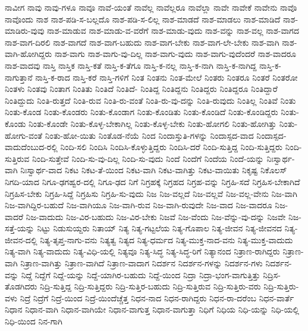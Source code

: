 {ನಾವೀಗ
ನಾವು
ನಾವು-ಗಳೂ
ನಾವೂ
ನಾವೆ-ಯಂತೆ
ನಾವೆಲ್ಲ
ನಾವೆಲ್ಲರೂ
ನಾವೆಲ್ಲಾ
ನಾವೇ
ನಾವೇಕೆ
ನಾವೇನು
ನಾವೊ
ನಾವೊಂದು
ನಾಶ
ನಾಶ-ಪಡಿ-ಸ-ಬಲ್ಲದೊ
ನಾಶ-ಪಡಿ-ಸ-ಲಿಲ್ಲ
ನಾಶ-ಮಾಡದೆ
ನಾಶ-ಮಾಡಲು
ನಾಶ-ಮಾಡಿದೆ
ನಾಶ-ಮಾಡಿರು-ವುವು
ನಾಶ-ಮಾಡುವ
ನಾಶ-ಮಾಡು-ವ-ವರೆಗೆ
ನಾಶ-ಮಾಡು-ವುದು
ನಾಶ-ವನ್ನು
ನಾಶ-ವಲ್ಲ
ನಾಶ-ವಾಗದ
ನಾಶ-ವಾಗ-ದಿರಲಿ
ನಾಶ-ವಾಗದೆ
ನಾಶ-ವಾಗ-ಬಹುದು
ನಾಶ-ವಾಗ-ಬೇಕು
ನಾಶ-ವಾಗ-ಲೇ-ಬೇಕು
ನಾಶ-ವಾಗಿ
ನಾಶ-ವಾಗಿ-ಹೋಗಿದ್ದರು
ನಾಶ-ವಾಗು
ನಾಶ-ವಾಗು-ವು-ದಿಲ್ಲ
ನಾಶ-ವಾಗು-ವುದು
ನಾಶ-ವಾಗು-ವುದೆಂದರೆ
ನಾಶ-ವಾದರೂ
ನಾಶ-ವಾದವು
ನಾಸ್ತಿ
ನಾಸ್ತಿಕ
ನಾಸ್ತಿ-ಕತೆ
ನಾಸ್ತಿ-ಕ-ತೆಗೂ
ನಾಸ್ತಿ-ಕ-ನಲ್ಲ
ನಾಸ್ತಿ-ಕ-ನಾಗಿ
ನಾಸ್ತಿ-ಕ-ನಾಗಿದ್ದ
ನಾಸ್ತಿ-ಕ-ನಾಗುತ್ತಾನೆ
ನಾಸ್ತಿ-ಕ-ರಾದ
ನಾಸ್ತಿ-ಕರೆ
ನಾಸ್ತಿ-ಗಳಿಗೆ
ನಿಂತ
ನಿಂತನು
ನಿಂತ-ಮೇಲೆ
ನಿಂತರು
ನಿಂತರೂ
ನಿಂತರೆ
ನಿಂತರೋ
ನಿಂತಳು
ನಿಂತವು
ನಿಂತಾಗ
ನಿಂತಿತು
ನಿಂತಿದೆ
ನಿಂತಿದೆ-
ನಿಂತಿದ್ದ
ನಿಂತಿದ್ದನು
ನಿಂತಿದ್ದರು
ನಿಂತಿದ್ದರೂ
ನಿಂತಿದ್ದಾರೆ
ನಿಂತಿದ್ದುದು
ನಿಂತಿ-ರುತ್ತದೆ
ನಿಂತಿ-ರುವ
ನಿಂತಿ-ರು-ವಂತೆ
ನಿಂತಿ-ರು-ವು-ದನ್ನು
ನಿಂತಿ-ರುವುದು
ನಿಂತಿಲ್ಲ
ನಿಂತಿವೆ
ನಿಂತು
ನಿಂತು-ಕೊಂಡ
ನಿಂತು-ಕೊಂಡರು
ನಿಂತು-ಕೊಂಡಾಗ
ನಿಂತು-ಕೊಂಡಿತು
ನಿಂತು-ಕೊಂಡಿದೆ
ನಿಂತು-ಕೊಂಡಿದ್ದರು
ನಿಂತು-ಕೊಂಡು
ನಿಂತು-ಕೊಂಡೇ
ನಿಂತು-ಕೊಳ್ಳ-ಬೇಕಾಗಿಲ್ಲ
ನಿಂತು-ಕೊಳ್ಳ-ಬೇಕು
ನಿಂತು-ಹೋಗಲಿ
ನಿಂತು-ಹೋಗಿತ್ತು
ನಿಂತು-ಹೋಗು-ವಂತೆ
ನಿಂತು-ಹೋ-ಯಿತು
ನಿಂತೊಡ-ನೆಯೆ
ನಿಂದ
ನಿಂದಾಸ್ತುತಿ-ಗಳನ್ನು
ನಿಂದಾಸ್ಪದ-ವಾದ
ನಿಂದಾಸ್ಪದ-ವಾದುದೆಂಬುದ-ರಲ್ಲಿ
ನಿಂದಿ-ಸಲಿ
ನಿಂದಿಸಿ
ನಿಂದಿಸಿ-ಕೊಳ್ಳುತ್ತಿದ್ದರು
ನಿಂದಿಸಿ-ದರೆ
ನಿಂದಿ-ಸುತ್ತಿದ್ದ
ನಿಂದಿ-ಸುತ್ತಿದ್ದರು
ನಿಂದಿ-ಸುತ್ತಿರುವ
ನಿಂದಿ-ಸುತ್ತೇವೆ
ನಿಂದಿ-ಸು-ವು-ದಿಲ್ಲ
ನಿಂದಿ-ಸು-ವುದು
ನಿಂದೆ
ನಿಂದೆಗೆ
ನಿಂದೆಯ
ನಿಂದೆ-ಯನ್ನು
ನಿಃಸ್ವಾರ್ಥ-ವಾಗಿ
ನಿಃಸ್ವಾರ್ಥ-ವಾದ
ನಿಕಟ
ನಿಕಟ-ತೆ-ಯಿಂದ
ನಿಕಟ-ವಾಗಿ
ನಿಕಟ-ವಾಗಿತ್ತು
ನಿಕಟ-ವಾಯಿತು
ನಿಕೃಷ್ಟ
ನಿಕೊಲಸ್
ನಿಗದಿ-ಯಾದ
ನಿಗೂ-ಢಗಹ್ವರ-ದಲ್ಲಿ
ನಿಗೂ-ಢದ
ನಿಗೆ
ನಿಗ್ರಹಕ್ಕೆ
ನಿಗ್ರಹದ
ನಿಗ್ರಹ-ವನ್ನು
ನಿಗ್ರಹಿ-ಸದೆ
ನಿಗ್ರಹಿಸ-ಬೇಕಾಗಿದೆ
ನಿಗ್ರಹಿಸ-ಬೇಕು
ನಿಗ್ರಹಿ-ಸಿದ್ದೆ
ನಿಗ್ರಹಿಸು
ನಿಗ್ರಹಿ-ಸು-ವುದು
ನಿಜ
ನಿಜ-ವಲ್ಲದೆ
ನಿಜ-ವಲ್ಲವೆ
ನಿಜ-ವಲ್ಲ-ವೇನು
ನಿಜ-ವಾಗಿ
ನಿಜ-ವಾಗಿದ್ದಿರ-ಬಹುದೆ
ನಿಜ-ವಾಗಿಯೂ
ನಿಜ-ವಾಗಿ-ರುವ
ನಿಜ-ವಾಗಿ-ರುವುದೇ
ನಿಜ-ವಾದ
ನಿಜ-ವಾದರೂ
ನಿಜ-ವಾದರೆ
ನಿಜ-ವಾದುದು
ನಿಜ-ವಿರ-ಬಹುದು
ನಿಜ-ವಿರ-ಬೇಕು
ನಿಜವೆ
ನಿಜ-ವೆಂದು
ನಿಜ-ವೆನ್ನು-ವು-ದನ್ನು
ನಿಜವೇ
ನಿಜ-ಸತ್ತೆ-ಯನ್ನು
ನಿಟ್ಟು
ನಿಡುಸುಯ್ದರು
ನಿತಾಯ್
ನಿತ್ಯ
ನಿತ್ಯ-ಗಟ್ಟಲೆಯ
ನಿತ್ಯ-ಗೊಪಾಲ
ನಿತ್ಯ-ಜೀವನ
ನಿತ್ಯ-ಜೀವನದ
ನಿತ್ಯ-ಜೀವನ-ದಲ್ಲಿ
ನಿತ್ಯ-ತೃಪ್ತ-ನಾಗು-ವನು
ನಿತ್ಯತ್ವ
ನಿತ್ಯದ
ನಿತ್ಯ-ಧರ್ಮದ
ನಿತ್ಯ-ಮುಕ್ತ-ನಾದ-ವನು
ನಿತ್ಯ-ಮುಕ್ತ-ವಾದುದು
ನಿತ್ಯ-ವಾಗಿ
ನಿತ್ಯ-ವಾದುದು
ನಿತ್ಯ-ವಿಧಿ-ಯಲ್ಲಿ
ನಿತ್ಯವೂ
ನಿತ್ಯ-ಸಿದ್ಧ
ನಿತ್ಯ-ಸಿದ್ಧ-ರಿಗೆ
ನಿತ್ಯಾನಂದ
ನಿತ್ರಾಣ-ರಾಗಿದ್ದರು
ನಿತ್ರಾಣ-ವಾಗಿ
ನಿತ್ರಾಣ-ವಾಗಿತ್ತು
ನಿತ್ರಾಣ-ವಾಗಿದೆ
ನಿತ್ರಾಣ-ವಾದಾಗ
ನಿದರ್ಶನ
ನಿದರ್ಶನ-ಗಳನ್ನು
ನಿದರ್ಶನ-ಗಳು
ನಿದರ್ಶನ-ವನ್ನು
ನಿದ್ದೆ
ನಿದ್ದೆಗೆ
ನಿದ್ದೆ-ಯನ್ನು
ನಿದ್ದೆ-ಯಾಗಿರ-ಬಹುದು
ನಿದ್ದೆ-ಯಿಂದ
ನಿದ್ರಾ
ನಿದ್ರಾ-ಭಂಗ-ವಾಗುತ್ತಿತ್ತು
ನಿದ್ರಿಸ-ತೊಡಗಿದರು
ನಿದ್ರಿ-ಸುತ್ತಿದ್ದ
ನಿದ್ರಿ-ಸುತ್ತಿದ್ದರು
ನಿದ್ರಿ-ಸುತ್ತಿರ-ಬಹುದು
ನಿದ್ರಿ-ಸುತ್ತಿರುವ
ನಿದ್ರಿ-ಸುತ್ತಿರು-ವರು
ನಿದ್ರಿ-ಸುತ್ತಿರು-ವಳು
ನಿದ್ರೆ
ನಿದ್ರೆಗೆ
ನಿದ್ರೆ-ಯಿಂದ
ನಿದ್ರೆ-ಯಿಂದೆಚ್ಚೆತ್ತ
ನಿಧನ-ನಾದ
ನಿಧನ-ರಾಗಿದ್ದರು
ನಿಧನ-ರಾ-ದರೆಂಬ
ನಿಧನ-ವಾರ್ತೆ
ನಿಧಾನ
ನಿಧಾನ-ವಾಗಿ
ನಿಧಾನ-ವಾಗಿಯೇ
ನಿಧಾನ-ವಾಗುತ್ತ
ನಿಧಾನ-ವಾಗುತ್ತಾ
ನಿಧಿಗೆ
ನಿಧಿಯ
ನಿಧಿ-ಯನ್ನು
ನಿಧಿ-ಯಲ್ಲಿ
ನಿಧಿ-ಯಿಂದ
ನಿನ-ಗಾಗಿ
}
